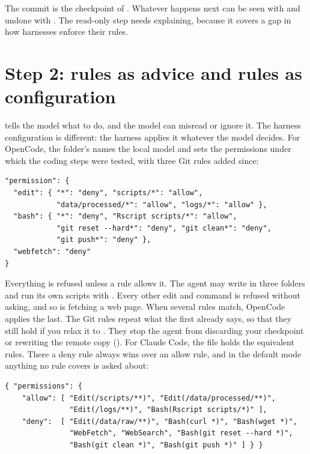 The commit is the checkpoint of . Whatever happens next can
be seen with  and undone with . The read-only
step needs explaining, because it covers a gap in how harnesses enforce their
rules.

\section{Step 2: rules as advice and rules as configuration}

 tells the model what to do, and the model can misread or
ignore it. The harness configuration is different: the harness applies it
whatever the model decides. For OpenCode, the folder's 
names the local model and sets the permissions under which the coding steps
were tested, with three Git rules added since:

\begin{lstlisting}[caption={Permissions in opencode.json}]
"permission": {
  "edit": { "*": "deny", "scripts/*": "allow",
            "data/processed/*": "allow", "logs/*": "allow" },
  "bash": { "*": "deny", "Rscript scripts/*": "allow",
            "git reset --hard*": "deny", "git clean*": "deny",
            "git push*": "deny" },
  "webfetch": "deny"
}
\end{lstlisting}

Everything is refused unless a rule allows it. The agent may write in three
folders and run its own scripts with . Every other edit and
command is refused without asking, and so is fetching a web page. When
several rules match, OpenCode applies the last. The Git rules repeat what the
first  already says, so that they still hold if you relax it
to . They stop the agent from discarding your checkpoint or
rewriting the remote copy (). For Claude Code, the file
 holds the equivalent rules. There a deny rule
always wins over an allow rule, and in the default mode anything no rule
covers is asked about:

\begin{lstlisting}[caption={Rules in .claude/settings.json}]
{ "permissions": {
    "allow": [ "Edit(/scripts/**)", "Edit(/data/processed/**)",
               "Edit(/logs/**)", "Bash(Rscript scripts/*)" ],
    "deny":  [ "Edit(/data/raw/**)", "Bash(curl *)", "Bash(wget *)",
               "WebFetch", "WebSearch", "Bash(git reset --hard *)",
               "Bash(git clean *)", "Bash(git push *)" ] } }
\end{lstlisting}

